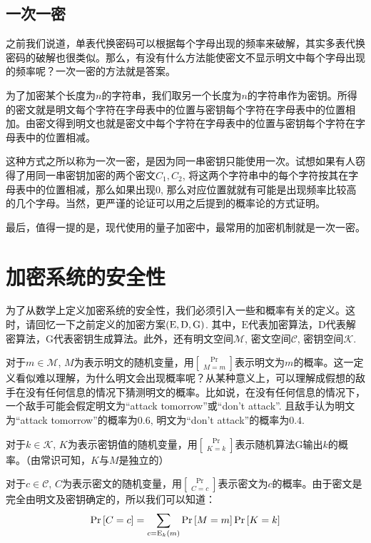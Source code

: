 \subsection{一次一密}
之前我们说道，单表代换密码可以根据每个字母出现的频率来破解，其实多表代换密码的破解也很类似。那么，有没有什么方法能使密文不显示明文中每个字母出现的频率呢？一次一密的方法就是答案。\par
为了加密某个长度为$n$的字符串，我们取另一个长度为$n$的字符串作为密钥。所得的密文就是明文每个字符在字母表中的位置与密钥每个字符在字母表中的位置相加。由密文得到明文也就是密文中每个字符在字母表中的位置与密钥每个字符在字母表中的位置相减。\par
这种方式之所以称为一次一密，是因为同一串密钥只能使用一次。试想如果有人窃得了用同一串密钥加密的两个密文$C_1, C_2$, 将这两个字符串中的每个字符按其在字母表中的位置相减，那么如果出现$0$, 那么对应位置就就有可能是出现频率比较高的几个字母。当然，更严谨的论证可以用之后提到的概率论的方式证明。\par
最后，值得一提的是，现代使用的量子加密中，最常用的加密机制就是一次一密。
\section{加密系统的安全性}
为了从数学上定义加密系统的安全性，我们必须引入一些和概率有关的定义。这时，请回忆一下之前定义的加密方案$\left( {\mathrm{E}, \mathrm{D}, \mathrm{G}}\right)$. 其中，$\mathrm{E}$代表加密算法，$\mathrm{D}$代表解密算法，$\mathrm{G}$代表密钥生成算法。此外，还有明文空间$\mathcal{M}$, 密文空间$\mathcal{C}$, 密钥空间$\mathcal{K}$.\par
对于$m\in\mathcal{M}$, $M$为表示明文的随机变量，用$\Pr\brack{M=m}$表示明文为$m$的概率。这一定义看似难以理解，为什么明文会出现概率呢？从某种意义上，可以理解成假想的敌手在没有任何信息的情况下猜测明文的概率。比如说，在没有任何信息的情况下，一个敌手可能会假定明文为``attack tomorrow''或``don't attack''. 且敌手认为明文为``attack tomorrow''的概率为$0.6$, 明文为``don't attack''的概率为$0.4$.\par
对于$k\in\mathcal{K}$, $K$为表示密钥值的随机变量，用$\Pr\brack{K=k}$表示随机算法$\mathrm{G}$输出$k$的概率。（由常识可知，$K$与$M$是独立的）\par
对于$c\in\mathcal{C}$, $C$为表示密文的随机变量，用$\Pr\brack{C=c}$表示密文为$c$的概率。由于密文是完全由明文及密钥确定的，所以我们可以知道：
\begin{equation}
    \Pr\left[ {C=c}\right]=\sum_{c={\mathrm{E}_{k}\left({m}\right)}} \Pr\left[ {M=m}\right]\Pr\left[ {K=k}\right]
\end{equation}

